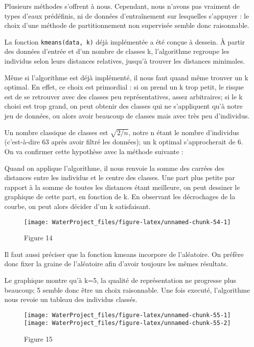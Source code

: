 \documentclass[]{article}
\begin{document}
Plusieurs méthodes s'offrent à nous. Cependant, nous n'avons pas
vraiment de types d'eaux prédéfinis, ni de données d'entraînement sur
lesquelles s'appuyer : le choix d'une méthode de partitionnement non
supervisée semble donc raisonnable.

La fonction \texttt{kmeans(data,\ k)} déjà implémentée a été conçue à
dessein. À partir des données d'entrée et d'un nombre de classes k,
l'algorithme regroupe les individus selon leurs distances relatives,
jusqu'à trouver les distances minimales.

Même si l'algorithme est déjà implémenté, il nous faut quand même
trouver un k optimal. En effet, ce choix est primordial : si on prend un
k trop petit, le risque est de se retrouver avec des classes peu
représentatives, assez arbitraires; si le k choisi est trop grand, on
peut obtenir des classes qui ne s'appliquent qu'à notre jeu de données,
ou alors avoir beaucoup de classes mais avec très peu d'individus.

Un nombre classique de classes est \(\sqrt{2/n}\), notre n étant le
nombre d'individus (c'est-à-dire 63 après avoir filtré les données); un
k optimal s'approcherait de 6. On va confirmer cette hypothèse avec la
méthode suivante :

Quand on applique l'algorithme, il nous renvoie la somme des carrées des
distances entre les individus et le centre des classes. Une part plus
petite par rapport à la somme de toutes les distances étant meilleure,
on peut dessiner le graphique de cette part, en fonction de k. En
observant les décrochages de la courbe, on peut alors décider d'un k
satisfaisant.

\begin{figure}

{\centering \texttt{[image: WaterProject\_files/figure-latex/unnamed-chunk-54-1]} 

}

\caption{Figure 14}\label{fig:unnamed-chunk-54}
\end{figure}

Il faut aussi préciser que la fonction kmeans incorpore de l'aléatoire.
On préfère donc fixer la graine de l'aléatoire afin d'avoir toujours les
mêmes résultats.

Le graphique montre qu'à k=5, la qualité de représentation ne progresse
plus beaucoup; 5 semble donc être un choix raisonnable. Une fois
executé, l'algorithme nous revoie un tableau des individus classés.

\begin{figure}

{\centering \texttt{[image: WaterProject\_files/figure-latex/unnamed-chunk-55-1]} \texttt{[image: WaterProject\_files/figure-latex/unnamed-chunk-55-2]} 

}

\caption{Figure 15}\label{fig:unnamed-chunk-55}
\end{figure}
\end{document}
